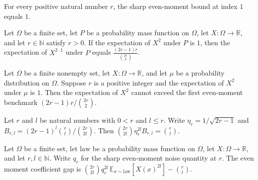 \begin{theorem}
\label{FABL.sharpEvenMomentBound_one}
\leanok
{}
For every positive natural number $r$, the sharp even-moment bound at index $1$ equals
$1$.
\end{theorem}

\begin{theorem}
\label{FABL.first_evenMoment_condition_redundant}
\leanok
{}
Let $\Omega$ be a finite set, let $P$ be a probability mass function on $\Omega$, let
$X:\Omega\to\mathbb{R}$, and let $r\in\mathbb{N}$ satisfy $r>0$. If the expectation of
$X^2$ under $P$ is $1$, then the expectation of $X^{2\cdot 1}$ under $P$ equals
$\frac{(2r-1)r}{\binom{2r}{2}}$.
\end{theorem}

\begin{theorem}
\label{FABL.not_first_evenMoment_gt_sharp}
\leanok
{}
Let $\Omega$ be a finite nonempty set, let $X:\Omega\to\mathbb R$, and let $\mu$ be a
probability distribution on $\Omega$. Suppose $r$ is a positive integer and the
expectation of $X^2$ under $\mu$ is $1$. Then the expectation of $X^2$ cannot exceed the
first even-moment benchmark $(2r-1)r/\binom{2r}{2}$.
\end{theorem}

\begin{theorem}
\label{FABL.sharp_even_coefficient_mul_bound}
\leanok
{}
Let $r$ and $l$ be natural numbers with $0<r$ and $l\le r$. Write $\eta_r=1/\sqrt{2r-1}$
and $B_{r,l}=(2r-1)^l\binom{r}{l}/\binom{2r}{2l}$. Then
$\binom{2r}{2l}\eta_r^{2l}B_{r,l}=\binom{r}{l}$.
\end{theorem}

\begin{definition}
\label{FABL.evenMomentCoefficientGap}
\leanok
{}
Let $\Omega$ be a finite set, let $\mathrm{law}$ be a probability mass function on
$\Omega$, let $X\colon\Omega\to\mathbb R$, and let $r,l\in\mathbb N$. Write $q_r$ for
the sharp even-moment noise quantity at $r$. The even moment coefficient gap is
$\binom{2r}{2l}q_r^{2l}\,\mathbb E_{x\sim\mathrm{law}}[X(x)^{2l}]-\binom rl$.
\end{definition}

